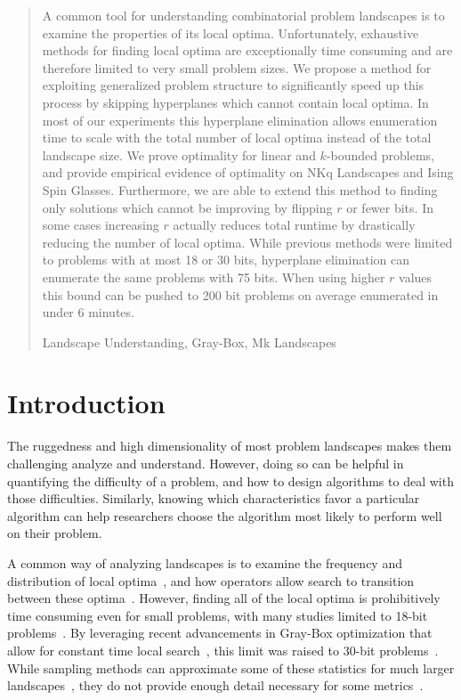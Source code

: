 \documentclass[runningheads,a4paper]{llncs}
\newcommand{\keywords}[1]{\par\addvspace\baselineskip
\noindent\keywordname\enspace\ignorespaces#1}
\begin{document}
\begin{abstract}
A common tool for understanding combinatorial problem landscapes
is to examine the properties of its local optima. Unfortunately,
exhaustive methods for finding local optima are exceptionally time
consuming and are therefore limited to very small problem sizes.
We propose a method for exploiting generalized problem structure
to significantly speed up this process by skipping hyperplanes
which cannot contain local optima. In most of our experiments
this hyperplane elimination allows enumeration time to scale with
the total number of local optima instead of the total landscape size.
We prove optimality for linear and $k$-bounded problems, and provide
empirical evidence of optimality on NKq Landscapes and Ising Spin Glasses.
Furthermore, we are able to extend this method to finding only solutions
which cannot be improving by flipping $r$ or fewer bits. In some cases
increasing $r$ actually reduces total runtime by drastically reducing the
number of local optima. While previous methods were limited to
problems with at most 18 or 30 bits, hyperplane elimination can enumerate the same problems with
75 bits. When using higher $r$ values this bound can be pushed to 200 bit problems
on average enumerated in under 6 minutes.


\keywords{Landscape Understanding, Gray-Box, Mk Landscapes}
\end{abstract}


\section{Introduction}
The ruggedness and high dimensionality of most problem landscapes makes them challenging
analyze and understand. However, doing so can be helpful in
quantifying the difficulty of a problem, and how to design algorithms to deal
with those difficulties. 
Similarly, knowing which characteristics favor
a particular
algorithm can help researchers choose the algorithm
most likely to perform well on their problem.

A common way of analyzing landscapes is to
examine the frequency and distribution of local optima~\cite{boese:1994:bigvalley},
and how operators allow search to transition between these
optima~\cite{tomassini:2008:nknetworks,verel:2011:nknetworks,ochoa:2015:crossovernetworks}.
However, finding all of the local optima is prohibitively time consuming
even for small problems, with many studies limited to 18-bit
problems~\cite{tomassini:2008:nknetworks,verel:2011:nknetworks}.
By leveraging recent advancements in Gray-Box optimization that allow for
constant time local search~\cite{chicano:2014:ball}, this limit was raised
to 30-bit problems~\cite{ochoa:2015:crossovernetworks}. While sampling
methods can approximate some of these statistics for much larger
landscapes~\cite{iclanzan:2014:somnetworks}, they do not provide enough
detail necessary for some metrics~\cite{ochoa:2015:crossovernetworks}.
\end{document}
